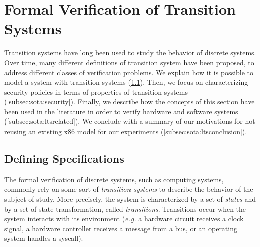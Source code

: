 
\section{Formal Verification of Transition Systems}
\label{sec:sota:formalisms}

Transition systems have long been used to study the behavior of discrete
systems.   
%
Over time, many different definitions of transition system have been proposed,
to address different classes of verification problems.
%
We explain how it is possible to model a system with transition systems
(\ref{subsec:sota:ltsdef}).
%
Then, we focus on characterizing security policies in terms of properties of
transition systems (\ref{subsec:sota:security}).
%
Finally, we describe how the concepts of this section have been used in the
literature in order to verify hardware and software systems
(\ref{subsec:sota:ltsrelated}).
%
We conclude with a summary of our motivations for not reusing an existing x86
model for our experiments (\ref{subsec:sota:ltsconclusion}). 

\subsection{Defining Specifications}
\label{subsec:sota:ltsdef}


The formal verification of discrete systems, such as computing systems, commonly
rely on some sort of \emph{transition systems} to describe the behavior of the
subject of study.  
%
More precisely, the system is characterized by a set of \emph{states} and by a
set of state transformation, called \emph{transitions}.
%
Transitions occur when the system interacts with its environment (\emph{e.g.} a
hardware circuit receives a clock signal, a hardware controller receives a
message from a bus, or an operating system handles a syscall).

